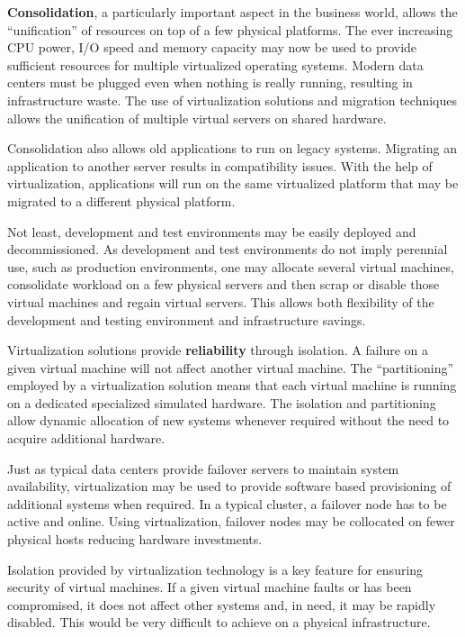 \textbf{Consolidation}, a particularly important aspect in the business world,
allows the ``unification'' of resources on top of a few physical platforms. The
ever increasing CPU power, I/O speed and memory capacity may now be used to
provide sufficient resources for multiple virtualized operating systems.
Modern data centers must be plugged even when nothing is really running,
resulting in infrastructure waste. The use of virtualization solutions and
migration techniques allows the unification of multiple virtual servers on
shared hardware.

Consolidation also allows old applications to run on legacy systems. Migrating
an application to another server results in compatibility issues. With the
help of virtualization, applications will run on the same virtualized platform
that may be migrated to a different physical platform.

Not least, development and test environments may be easily deployed and
decommissioned. As development and test environments do not imply perennial
use, such as production environments, one may allocate several virtual
machines, consolidate workload on a few physical servers and then scrap or
disable those virtual machines and regain virtual servers. This allows both
flexibility of the development and testing environment and infrastructure
savings.

Virtualization solutions provide \textbf{reliability} through isolation. A
failure on a given virtual machine will not affect another virtual machine.
The ``partitioning'' employed by a virtualization solution means that each
virtual machine is running on a dedicated specialized simulated hardware. The
isolation and partitioning allow dynamic allocation of new systems whenever
required without the need to acquire additional hardware.

Just as typical data centers provide failover servers to maintain system
availability, virtualization may be used to provide software based
provisioning of additional systems when required. In a typical cluster, a
failover node has to be active and online. Using virtualization, failover
nodes may be collocated on fewer physical hosts reducing hardware investments.

Isolation provided by virtualization technology is a key feature for ensuring
security of virtual machines. If a given virtual machine faults or has been
compromised, it does not affect other systems and, in need, it may be rapidly
disabled. This would be very difficult to achieve on a physical
infrastructure.


